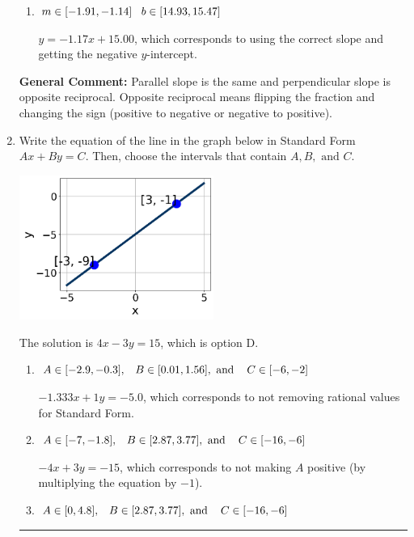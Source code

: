 \documentclass{extbook}[14pt]
\newcommand{\litem}[1]{\item #1

\rule{\textwidth}{0.4pt}}
\begin{document}
\begin{enumerate}
{\begin{enumerate}[label=\Alph*.]
 $y = 1.17x - 1.00$, which corresponds to using the negative slope.
\item \( m \in [-1.91, -1.14] \hspace*{3mm} b \in [14.93, 15.47] \)

 $y = -1.17x + 15.00$, which corresponds to using the correct slope and getting the negative $y$-intercept.
\end{enumerate}

\textbf{General Comment:} Parallel slope is the same and perpendicular slope is opposite reciprocal. Opposite reciprocal means flipping the fraction and changing the sign (positive to negative or negative to positive).
}
\litem{
Write the equation of the line in the graph below in Standard Form $Ax+By=C$. Then, choose the intervals that contain $A, B, \text{ and } C$.

\begin{center}
    \includegraphics[width=0.5\textwidth]{../Figures/linearGraphToStandardCopyC.png}
\end{center}


The solution is \( 4x - 3y = 15 \), which is option D.\begin{enumerate}[label=\Alph*.]
\item \( A \in [-2.9, -0.3], \hspace{3mm} B \in [0.01, 1.56], \text{ and } \hspace{3mm} C \in [-6, -2] \)

 $-1.333x + 1y = -5.0$, which corresponds to not removing rational values for Standard Form.
\item \( A \in [-7, -1.8], \hspace{3mm} B \in [2.87, 3.77], \text{ and } \hspace{3mm} C \in [-16, -6] \)

 $-4x + 3y = -15$, which corresponds to not making $A$ positive (by multiplying the equation by $-1$).
\item \( A \in [0, 4.8], \hspace{3mm} B \in [2.87, 3.77], \text{ and } \hspace{3mm} C \in [-16, -6] \)


\end{enumerate}}
\end{enumerate}
\end{document}
